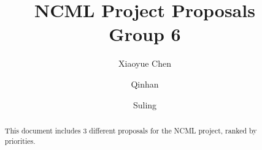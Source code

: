 \documentclass{article}
\title{NCML Project Proposals\\Group 6}
\author{Xiaoyue Chen \and Qinhan \and Suling}
\begin{document}
\maketitle

\begin{abstract}
	This document includes 3 different proposals for the NCML project, ranked by
	priorities.
\end{abstract}





\printbibliography
\end{document}
